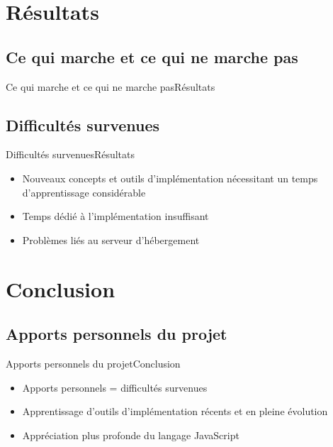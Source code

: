 \documentclass[usenames,dvipsnames]{beamer}
\begin{document}
\section{Résultats}
\subsection{Ce qui marche et ce qui ne marche pas}
\begin{frame}{Ce qui marche et ce qui ne marche pas}{Résultats}

\end{frame}

\subsection{Difficultés survenues}
\begin{frame}{Difficultés survenues}{Résultats}
  \begin{itemize}
    \item Nouveaux concepts et outils d'implémentation nécessitant un temps d'apprentissage considérable
    \item Temps dédié à l'implémentation insuffisant
    \item Problèmes liés au serveur d'hébergement
  \end{itemize}
\end{frame}
\section{Conclusion}
\subsection{Apports personnels du projet}
\begin{frame}{Apports personnels du projet}{Conclusion}
  \begin{itemize}
    \item Apports personnels = difficultés survenues
    \item Apprentissage d'outils d'implémentation récents et en pleine évolution
    \item Appréciation plus profonde du langage JavaScript
  \end{itemize}
\end{frame}
\end{document}
